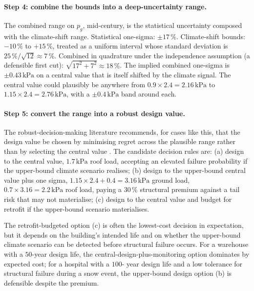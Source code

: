 \paragraph{Step 4: combine the bounds into a deep-uncertainty
range.}
The combined range on $p_{g}$, mid-century, is the statistical
uncertainty composed with the climate-shift range. Statistical
one-sigma: $\pm 17\,\%$. Climate-shift bounds: $-10\,\%$ to
$+15\,\%$, treated as a uniform interval whose standard deviation
is $25\,\% / \sqrt{12} \approx 7\,\%$. Combined in quadrature
under the independence assumption (a defensible first cut):
$\sqrt{17^{2} + 7^{2}} \approx 18\,\%$. The implied combined
one-sigma is $\pm 0.43 \,\si{\kilo\pascal}$ on a central value
that is itself shifted by the climate signal. The central value
could plausibly be anywhere from $0.9 \times 2.4 = 2.16 \,\si
{\kilo\pascal}$ to $1.15 \times 2.4 = 2.76 \,\si{\kilo\pascal}$,
with a $\pm 0.4 \,\si{\kilo\pascal}$ band around each.

\paragraph{Step 5: convert the range into a robust design value.}
The robust-decision-making literature recommends, for cases like
this, that the design value be chosen by minimising regret across
the plausible range rather than by selecting the central value
\cite{ch09-paper:hallegatte-2009}. The candidate decision rules
are: (a) design to the central value, $1.7 \,\si{\kilo\pascal}$
roof load, accepting an elevated failure probability if the
upper-bound climate scenario realises; (b) design to the
upper-bound central value plus one sigma, $1.15 \times 2.4 + 0.4
= 3.16 \,\si{\kilo\pascal}$ ground load, $0.7 \times 3.16 = 2.2 \,
\si{\kilo\pascal}$ roof load, paying a $30\,\%$ structural
premium against a tail risk that may not materialise; (c) design
to the central value and budget for retrofit if the upper-bound
scenario materialises.

The retrofit-budgeted option (c) is often the lowest-cost
decision in expectation, but it depends on the building's
intended life and on whether the upper-bound climate scenario can
be detected before structural failure occurs. For a warehouse
with a $50$-year design life, the central-design-plus-monitoring
option dominates by expected cost; for a hospital with a $100$-
year design life and a low tolerance for structural failure
during a snow event, the upper-bound design option (b) is
defensible despite the premium.

